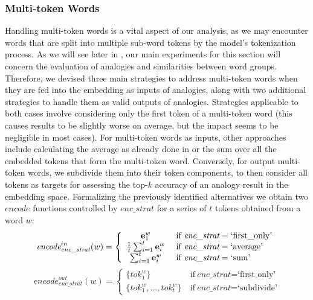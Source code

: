 \subsubsection{Multi-token Words}

Handling multi-token words is a vital aspect of our analysis, as we may encounter words that are split into multiple sub-word tokens by the model's tokenization process.
As we will see later in , our main experiments for this section will concern the evaluation of analogies and similarities between word groups.
Therefore, we devised three main strategies to address multi-token words when they are fed into the embedding as inputs of analogies, along with two additional strategies to handle them as valid outputs of analogies.
Strategies applicable to both cases involve considering only the first token of a multi-token word (this causes results to be slightly worse on average, but the impact seems to be negligible in most cases).
For multi-token words as inputs, other approaches include calculating the average as already done in  or the sum over all the embedded tokens that form the multi-token word.
Conversely, for output multi-token words, we subdivide them into their token components, to then consider all tokens as targets for assessing the top-$k$ accuracy of an analogy result in the embedding space.
Formalizing the previously identified alternatives we obtain two $\textit{encode}$ functions controlled by $\textit{enc\_strat}$ for a series of $t$ tokens obtained from a word $w$:
\begin{equation}
    \label{eq:method_embeddings_multitok-in}
    {\textit{encode}}_{\textit{enc\_strat}}^{in}(w) = 
    \left\{
    \begin{array}{cl}
        \gbm{e}_1^w &\ \text{if}\ \textit{enc\_strat} = \text{`first\_only'} \\
        \frac{1}{t}\sum_{i=1}^{t}{\gbm{e}_i^w} &\ \text{if}\ \textit{enc\_strat} = \text{`average'} \\
        \sum_{i=1}^{t}{\gbm{e}_i^w} &\ \text{if}\ \textit{enc\_strat} = \text{`sum'}
    \end{array}
    \right.
\end{equation}
\begin{equation}
    \label{eq:method_embeddings_multitok-out}
    {\textit{encode}}_{\textit{enc\_strat}}^{out}(w) = 
    \left\{
    \begin{array}{cl}
        \{ tok_1^w \} &\ \text{if}\ \textit{enc\_strat} = \text{`first\_only'} \\
        \{ tok_1^w, \ldots, tok_t^w \} &\ \text{if}\ \textit{enc\_strat} = \text{`subdivide'}
    \end{array}
    \right.
\end{equation}
